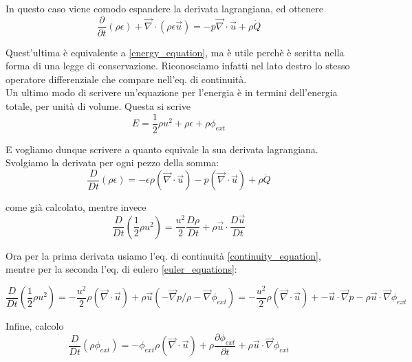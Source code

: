 \documentclass{report}
\begin{document}
In questo caso viene comodo espandere la derivata lagrangiana, ed ottenere 
\begin{equation}
    \frac{\partial}{\partial t}(\rho\epsilon) + \vec{\nabla}\cdot(\rho\epsilon\vec{u}) = -p\vec{\nabla}\cdot\vec{u} + \rho\dot{Q}
\end{equation}

Quest'ultima è equivalente a \ref{energy_equation}, ma è utile perchè è scritta nella forma di una legge di conservazione. Riconosciamo infatti nel lato destro lo stesso operatore differenziale che compare nell'eq. di continuità. \\

Un ultimo modo di scrivere un'equazione per l'energia è in termini dell'energia totale, per unità di volume. Questa si scrive 
\begin{equation}
    E = \frac{1}{2}\rho u^2 + \rho\epsilon + \rho\phi_{ext}
\end{equation}

E vogliamo dunque scrivere a quanto equivale la sua derivata lagrangiana. Svolgiamo la derivata per ogni pezzo della somma: 
\begin{equation}
    \frac{D}{Dt}(\rho\epsilon) = -\epsilon\rho(\vec{\nabla}\cdot \vec{u}) - p(\vec{\nabla}  \cdot \vec{u}) + \rho\dot{Q}
\end{equation}

come già calcolato, mentre invece 
\begin{equation}
    \frac{D}{Dt}\left( \frac{1}{2}\rho u^2\right) = \frac{u^2}{2}\frac{D\rho}{Dt}+ \rho \vec{u}\cdot \frac{D\vec{u}}{Dt}
\end{equation}

Ora per la prima derivata usiamo l'eq. di continuità \ref{continuity_equation}, mentre per la seconda l'eq. di eulero \ref{euler_equations}:

\begin{equation}
      \frac{D}{Dt}\left( \frac{1}{2}\rho u^2\right) = -\frac{u^2}{2}\rho(\vec{\nabla}\cdot \vec{u}) + \rho\vec{u}(-\vec{\nabla}p/\rho - \vec{\nabla}\phi_{ext}) = -\frac{u^2}{2}\rho(\vec{\nabla}\cdot \vec{u}) + -\vec{u} \cdot \vec{\nabla}p - \rho \vec{u} \cdot \vec{\nabla}\phi_{ext}
\end{equation}

Infine, calcolo 
\begin{equation}
    \frac{D}{Dt}(\rho\phi_{ext}) = -\phi_{ext}\rho (\vec{\nabla}\cdot\vec{u}) +\rho\frac{\partial \phi_{ext}}{\partial t} + \rho \vec{u}\cdot \vec{\nabla}\phi_{ext}
\end{equation}
\end{document}

